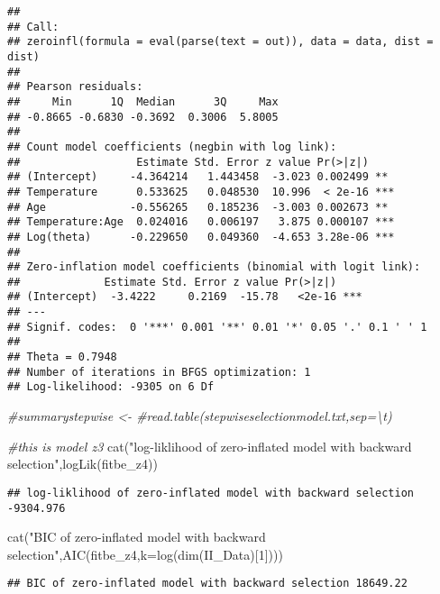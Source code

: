 \documentclass[
]{article}
\newenvironment{Shaded}{\begin{snugshade}}{\end{snugshade}}
\newcommand{\AttributeTok}[1]{\textcolor[rgb]{0.77,0.63,0.00}{#1}}
\newcommand{\CommentTok}[1]{\textcolor[rgb]{0.56,0.35,0.01}{\textit{#1}}}
\newcommand{\DecValTok}[1]{\textcolor[rgb]{0.00,0.00,0.81}{#1}}
\newcommand{\FunctionTok}[1]{\textcolor[rgb]{0.00,0.00,0.00}{#1}}
\newcommand{\NormalTok}[1]{#1}
\newcommand{\StringTok}[1]{\textcolor[rgb]{0.31,0.60,0.02}{#1}}
\begin{document}
\begin{verbatim}
## 
## Call:
## zeroinfl(formula = eval(parse(text = out)), data = data, dist = dist)
## 
## Pearson residuals:
##     Min      1Q  Median      3Q     Max 
## -0.8665 -0.6830 -0.3692  0.3006  5.8005 
## 
## Count model coefficients (negbin with log link):
##                  Estimate Std. Error z value Pr(>|z|)    
## (Intercept)     -4.364214   1.443458  -3.023 0.002499 ** 
## Temperature      0.533625   0.048530  10.996  < 2e-16 ***
## Age             -0.556265   0.185236  -3.003 0.002673 ** 
## Temperature:Age  0.024016   0.006197   3.875 0.000107 ***
## Log(theta)      -0.229650   0.049360  -4.653 3.28e-06 ***
## 
## Zero-inflation model coefficients (binomial with logit link):
##             Estimate Std. Error z value Pr(>|z|)    
## (Intercept)  -3.4222     0.2169  -15.78   <2e-16 ***
## ---
## Signif. codes:  0 '***' 0.001 '**' 0.01 '*' 0.05 '.' 0.1 ' ' 1 
## 
## Theta = 0.7948 
## Number of iterations in BFGS optimization: 1 
## Log-likelihood: -9305 on 6 Df
\end{verbatim}

\begin{Shaded}
\begin{Highlighting}[]
\CommentTok{\#summarystepwise \textless{}{-}  \#read.table(\textquotesingle{}stepwiseselectionmodel.txt\textquotesingle{},sep=\textquotesingle{}\textbackslash{}t\textquotesingle{})}

\CommentTok{\#this is model z3}
\FunctionTok{cat}\NormalTok{(}\StringTok{"log{-}liklihood of zero{-}inflated model with backward selection"}\NormalTok{,}\FunctionTok{logLik}\NormalTok{(fitbe\_z4))}
\end{Highlighting}
\end{Shaded}

\begin{verbatim}
## log-liklihood of zero-inflated model with backward selection -9304.976
\end{verbatim}

\begin{Shaded}
\begin{Highlighting}[]
\FunctionTok{cat}\NormalTok{(}\StringTok{"BIC of zero{-}inflated model with backward selection"}\NormalTok{,}\FunctionTok{AIC}\NormalTok{(fitbe\_z4,}\AttributeTok{k=}\FunctionTok{log}\NormalTok{(}\FunctionTok{dim}\NormalTok{(II\_Data)[}\DecValTok{1}\NormalTok{])))}
\end{Highlighting}
\end{Shaded}

\begin{verbatim}
## BIC of zero-inflated model with backward selection 18649.22
\end{verbatim}
\end{document}
